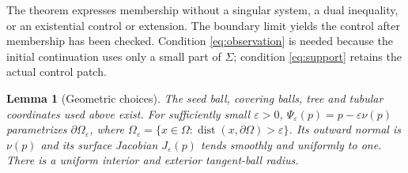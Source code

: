 \documentclass[11pt]{article}
\newtheorem{lemma}[theorem]{Lemma}
\theoremstyle{remark}
\newcommand{\Om}{\Omega}
\DeclareMathOperator{\dist}{dist}
\begin{document}
The theorem expresses membership without a singular system, a dual
inequality, or an existential control or extension.
The boundary limit yields the control after membership has been checked.
Condition \eqref{eq:observation} is needed because the initial continuation
uses only a small part of $\Sigma$; condition \eqref{eq:support} retains
the actual control patch.

\begin{lemma}[Geometric choices]\label{lem:geometry}
The seed ball, covering balls, tree and tubular coordinates used above exist.
For sufficiently small $\varepsilon>0$,
$\Psi_\varepsilon(p)=p-\varepsilon\nu(p)$ parametrizes
$\partial\Om_\varepsilon$, where
$\Om_\varepsilon=\{x\in\Om:\dist(x,\partial\Om)>\varepsilon\}$.
Its outward normal is $\nu(p)$ and its surface Jacobian
$J_\varepsilon(p)$ tends smoothly and uniformly to one.
There is a uniform interior and exterior tangent-ball radius.
\end{lemma}
\end{document}
